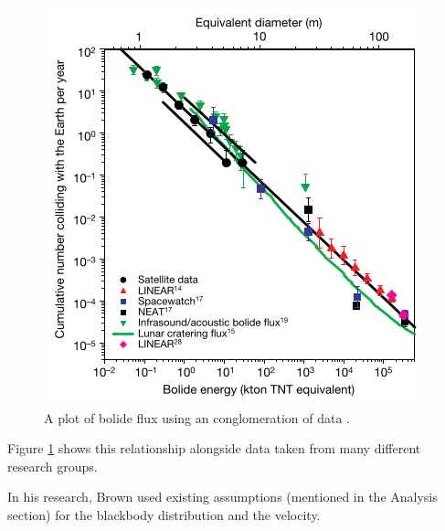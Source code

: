 \begin{figure}[ht!]
  \centering
  \includegraphics[scale=0.7]{images/flux_brown.png}
  \caption{A plot of bolide flux using an conglomeration of data \cite{brown_p_flux_2002}.}
  \label{powerlaw}
\end{figure}


Figure \ref{powerlaw} shows this relationship alongside data taken from many different research groups.  

In his research, Brown used existing assumptions (mentioned in the Analysis section) for the blackbody distribution and the velocity.  



